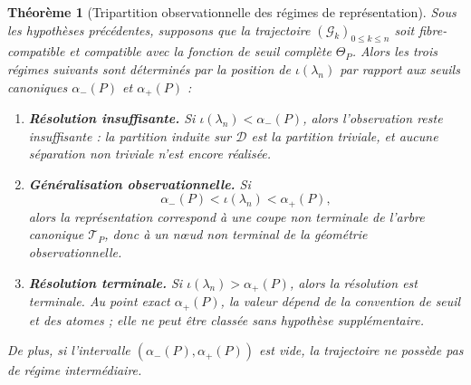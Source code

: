 \documentclass[11pt,a4paper,openany]{book}
\newtheorem{theorem}[definition]{Théorème}
\begin{document}
\begin{theorem}[Tripartition observationnelle des régimes de représentation]
\label{thm:tripartition-representation}
Sous les hypothèses précédentes, supposons que la trajectoire \((\mathcal G_k)_{0\le k\le n}\) soit fibre-compatible et compatible avec la fonction de seuil complète \(\Theta_P\). Alors les trois régimes suivants sont déterminés par la position de \(\iota(\lambda_n)\) par rapport aux seuils canoniques \(\alpha_-(P)\) et \(\alpha_+(P)\) :

\begin{enumerate}[label=\textbf{(\arabic*)}]
\item \textbf{Résolution insuffisante.} Si \(\iota(\lambda_n)< \alpha_-(P)\), alors l'observation reste insuffisante : la partition induite sur \(\mathcal D\) est la partition triviale, et aucune séparation non triviale n'est encore réalisée.

\item \textbf{Généralisation observationnelle.} Si
\[
\alpha_-(P)< \iota(\lambda_n)< \alpha_+(P),
\]
alors la représentation correspond à une coupe non terminale de l'arbre canonique \(\mathcal T_P\), donc à un nœud non terminal de la géométrie observationnelle.

\item \textbf{Résolution terminale.} Si \(\iota(\lambda_n)> \alpha_+(P)\), alors la résolution est terminale. Au point exact \(\alpha_+(P)\), la valeur dépend de la convention de seuil et des atomes ; elle ne peut être classée sans hypothèse supplémentaire.
\end{enumerate}

De plus, si l'intervalle \((\alpha_-(P),\alpha_+(P))\) est vide, la trajectoire ne possède pas de régime intermédiaire.
\end{theorem}
\end{document}
